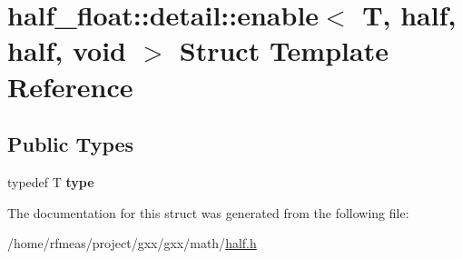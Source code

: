\hypertarget{structhalf__float_1_1detail_1_1enable_3_01T_00_01half_00_01half_00_01void_01_4}{}\section{half\+\_\+float\+:\+:detail\+:\+:enable$<$ T, half, half, void $>$ Struct Template Reference}
\label{structhalf__float_1_1detail_1_1enable_3_01T_00_01half_00_01half_00_01void_01_4}
\subsection*{Public Types}
\begin{DoxyCompactItemize}
\item 
typedef T {\bfseries type}\hypertarget{structhalf__float_1_1detail_1_1enable_3_01T_00_01half_00_01half_00_01void_01_4_aceb3d224d5b5da6539c179cb8cb23bda}{}\label{structhalf__float_1_1detail_1_1enable_3_01T_00_01half_00_01half_00_01void_01_4_aceb3d224d5b5da6539c179cb8cb23bda}

\end{DoxyCompactItemize}


The documentation for this struct was generated from the following file\+:\begin{DoxyCompactItemize}
\item 
/home/rfmeas/project/gxx/gxx/math/\hyperlink{half_8h}{half.\+h}\end{DoxyCompactItemize}
